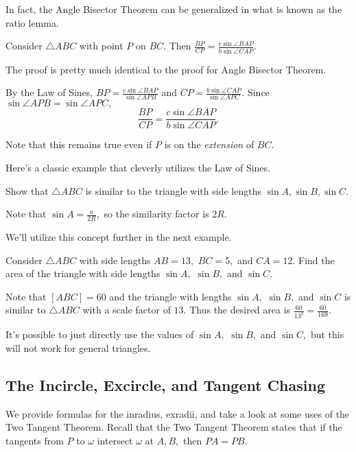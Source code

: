 \documentclass[blue,onecol]{shooting}
\begin{document}
In fact, the Angle Bisector Theorem can be generalized in what is known as the ratio lemma.

\begin{theo}
Consider $\triangle ABC$ with point $P$ on $BC.$ Then $\frac{BP}{CP}=\frac{c\sin \angle BAP}{b\sin \angle CAP}.$
\end{theo}

The proof is pretty much identical to the proof for Angle Bisector Theorem.

\begin{pro}
By the Law of Sines, $BP=\frac{c\sin\angle BAP}{\sin\angle APB}$ and $CP=\frac{b\sin\angle CAP}{\sin\angle APC}.$ Since $\sin\angle APB=\sin\angle APC,$
\[\frac{BP}{CP}=\frac{c\sin \angle BAP}{b\sin \angle CAP}.\]
\end{pro}

Note that this remains true even if $P$ is on the \textit{extension} of $BC.$

Here's a classic example that cleverly utilizes the Law of Sines.

\begin{exam}
Show that $\triangle ABC$ is similar to the triangle with side lengths $\sin A,\sin B,\sin C.$
\end{exam}

\begin{sol}
Note that $\sin A=\frac{a}{2R},$ so the similarity factor is $2R.$
\end{sol}

We'll utilize this concept further in the next example.

\begin{exam}
Consider $\triangle ABC$ with side lengths $AB=13,$ $BC=5,$ and $CA=12.$ Find the area of the triangle with side lengths $\sin A,$ $\sin B,$ and $\sin C.$
\end{exam}

\begin{sol}
Note that $[ABC]=60$ and the triangle with lengths $\sin A,$ $\sin B,$ and $\sin C$ is similar to $\triangle ABC$ with a scale factor of $13.$ Thus the desired area is $\frac{60}{13^2}=\frac{60}{169}.$
\end{sol}

It's possible to just directly use the values of $\sin A,$ $\sin B,$ and $\sin C,$ but this will not work for general triangles.

\subsection{The Incircle, Excircle, and Tangent Chasing}
We provide formulas for the inradius, exradii, and take a look at some uses of the Two Tangent Theorem. Recall that the Two Tangent Theorem states that if the tangents from $P$ to $\omega$ intersect $\omega$ at $A,B,$ then $PA=PB.$
\end{document}
